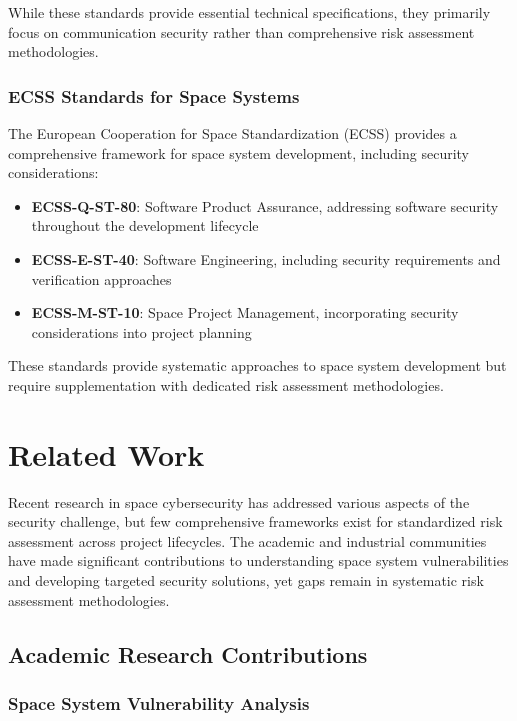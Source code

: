 \documentclass[binding=0.6cm]{sapthesis}
\begin{document}
While these standards provide essential technical specifications, they primarily focus on communication security rather than comprehensive risk assessment methodologies.

\subsubsection{ECSS Standards for Space Systems}

The European Cooperation for Space Standardization (ECSS) provides a comprehensive framework for space system development, including security considerations:

\begin{itemize}
    \item \textbf{ECSS-Q-ST-80}: Software Product Assurance, addressing software security throughout the development lifecycle
    \item \textbf{ECSS-E-ST-40}: Software Engineering, including security requirements and verification approaches
    \item \textbf{ECSS-M-ST-10}: Space Project Management, incorporating security considerations into project planning
\end{itemize}

These standards provide systematic approaches to space system development but require supplementation with dedicated risk assessment methodologies.

\section{Related Work}

Recent research in space cybersecurity has addressed various aspects of the security challenge, but few comprehensive frameworks exist for standardized risk assessment across project lifecycles. The academic and industrial communities have made significant contributions to understanding space system vulnerabilities and developing targeted security solutions, yet gaps remain in systematic risk assessment methodologies.

\subsection{Academic Research Contributions}

\subsubsection{Space System Vulnerability Analysis}
\end{document}
